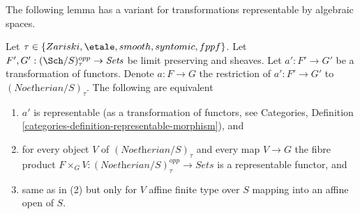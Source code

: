 \noindent
The following lemma has a variant for transformations
representable by algebraic spaces.

\begin{lemma}
\label{lemma-representable}
Let $\tau \in \{Zariski, \etale, smooth, syntomic, fppf\}$.
Let $F', G' : (\Sch/S)_\tau^{opp} \to \textit{Sets}$ be limit preserving
and sheaves. Let $a' : F' \to G'$ be a transformation of functors.
Denote $a : F \to G$ the restriction of $a' : F' \to G'$ to
$(\textit{Noetherian}/S)_\tau$. The following are equivalent
\begin{enumerate}
\item $a'$ is representable (as a transformation of functors, see
Categories, Definition \ref{categories-definition-representable-morphism}), and
\item for every object $V$ of $(\textit{Noetherian}/S)_\tau$
and every map $V \to G$ the fibre product
$F \times_G V : (\textit{Noetherian}/S)_\tau^{opp} \to \textit{Sets}$
is a representable functor, and
\item same as in (2) but only for $V$ affine finite type over $S$
mapping into an affine open of $S$.
\end{enumerate}
\end{lemma}

